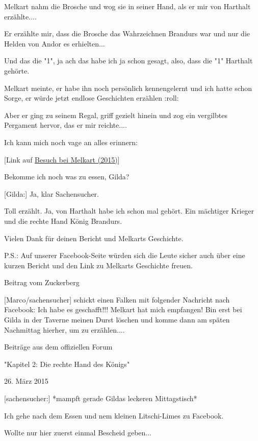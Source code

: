 \documentclass[10pt, a4paper, oneside]{book}
\newcommand{\refstorytext}[1]{\hyperref[Storytext: #1]{#1}}
\begin{document}
\begin{multicols}{2}
Melkart nahm die Brosche und wog sie in seiner Hand, als er mir von Harthalt erzählte....

Er erzählte mir, dass die Brosche das Wahrzeichnen Brandurs war und nur die Helden von Andor es erhielten...

Und das die "1", ja ach das habe ich ja schon gesagt, also, dass die "1" Harthalt gehörte.

Melkart meinte, er habe ihn noch persönlich kennengelernt und ich hatte schon Sorge, er würde jetzt endlose Geschichten erzählen :roll:

Aber er ging zu seinem Regal, griff gezielt hinein und zog ein vergilbtes Pergament hervor, das er mir reichte....

Ich kann mich noch vage an alles erinnern:

[Link auf \refstorytext{Besuch bei Melkart (2015)}]

Bekomme ich noch was zu essen, Gilda?

[Gilda:] Ja, klar Sachensucher.

Toll erzählt. Ja, von Harthalt habe ich schon mal gehört. Ein mächtiger Krieger und die rechte Hand König Brandurs.

Vielen Dank für deinen Bericht und Melkarts Geschichte.

P.S.: Auf unserer Facebook-Seite würden sich die Leute sicher auch über eine kurzen Bericht und den Link zu Melkarts Geschichte freuen.

\begin{center}
    Beitrag vom Zuckerberg
\end{center}

[Marco/sachensucher] schickt einen Falken mit folgender Nachricht nach Facebook: Ich habe es geschafft!!! Melkart hat mich empfangen! Bin erst bei Gilda in der Taverne meinen Durst löschen und komme dann am späten Nachmittag hierher, um zu erzählen.... 

\begin{center}
    Beiträge aus dem offiziellen Forum

    "Kapitel 2: Die rechte Hand des Königs"

    26. März 2015
\end{center}

[sachensucher:] *mampft gerade Gildas leckeren Mittagstisch*

Ich gehe nach dem Essen und nem kleinen Litschi-Limes zu Facebook.

Wollte nur hier zuerst einmal Bescheid geben...


\end{multicols}
\end{document}
